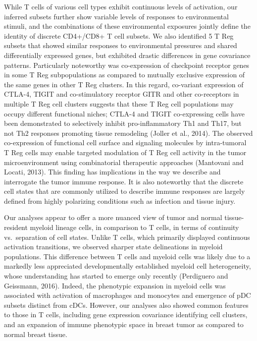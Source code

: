 While T cells of various cell types exhibit continuous levels of activation, our inferred subsets further show variable levels of responses to environmental stimuli, and the combinations of these environmental exposures jointly define the identity of discrete CD4+/CD8+ T cell subsets. 
We also identified 5 T Reg subsets that showed similar responses to environmental pressures and shared differentially expressed genes, but exhibited drastic differences in gene covariance patterns. 
Particularly noteworthy was co-expression of checkpoint receptor genes in some T Reg subpopulations as compared to mutually exclusive expression of the same genes in other T Reg clusters. 
In this regard, co-variant expression of CTLA-4, TIGIT and co-stimulatory receptor GITR and other co-receptors in multiple T Reg cell clusters suggests that these T Reg cell populations may occupy different functional niches; CTLA-4 and TIGIT co-expressing cells have been demonstrated to selectively inhibit pro-inflammatory Th1 and Th17, but not Th2 responses promoting tissue remodeling (Joller et al., 2014). %
The observed co-expression of functional cell surface and signaling molecules by intra-tumoral T Reg cells may enable targeted modulation of T Reg cell activity in the tumor microenvironment using combinatorial therapeutic approaches (Mantovani and Locati, 2013).  %
This finding has implications in the way we describe and interrogate the tumor immune response. 
It is also noteworthy that the discrete cell states that are commonly utilized to describe immune responses are largely defined from highly polarizing conditions such as infection and tissue injury.

Our analyses appear to offer a more nuanced view of tumor and normal tissue-resident myeloid lineage cells, in comparison to T cells, in terms of continuity vs.\ separation of cell states. 
Unlike T cells, which primarily displayed continuous activation transitions, we observed sharper state delineations in myeloid populations. 
This difference between T cells and myeloid cells was likely due to a markedly less appreciated developmentally established myeloid cell heterogeneity, whose understanding has started to emerge only recently (Perdiguero and Geissmann, 2016). %
Indeed, the phenotypic expansion in myeloid cells was associated with activation of macrophages and monocytes and emergence of pDC subsets distinct from cDCs. 
However, our analyses also showed common features to those in T cells, including gene expression covariance identifying cell clusters, and an expansion of immune phenotypic space in breast tumor as compared to normal breast tissue.

